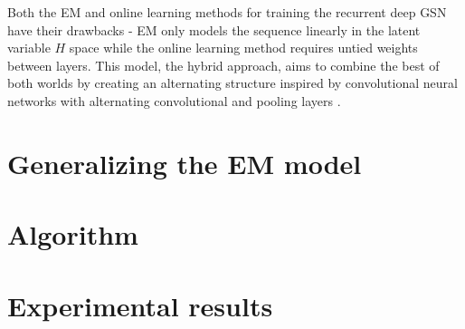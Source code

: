 Both the EM and online learning methods for training the recurrent deep GSN have their drawbacks - EM only models the sequence linearly in the latent variable \(H\) space while the online learning method requires untied weights between layers. This model, the hybrid approach, aims to combine the best of both worlds by creating an alternating structure inspired by convolutional neural networks with alternating convolutional and pooling layers \cite{lenet5}.

\section{Generalizing the EM model}

\section{Algorithm}

\section{Experimental results}
